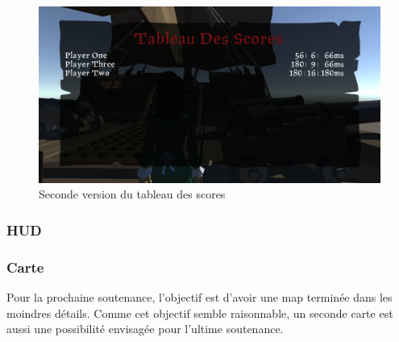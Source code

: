     \begin{figure}[hbt!]
            \centering
            \includegraphics[scale=0.3]{img/newscoreboard.PNG}
            \caption{Seconde version du tableau des scores}
    \end{figure}


    \subsubsection{HUD}
    

	\subsubsection{Carte}

	Pour la prochaine soutenance, l'objectif est d'avoir une map terminée dans les moindres 
	détails. Comme cet objectif semble raisonnable, un seconde carte est aussi une possibilité 
	envisagée pour l'ultime soutenance.